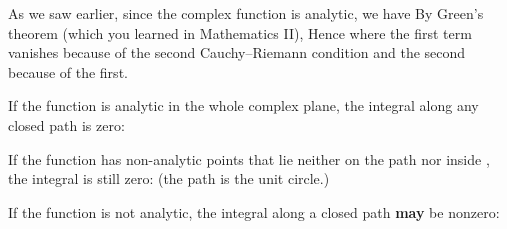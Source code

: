 
\begin{EMproof}

As we saw earlier, since the complex function is analytic, we have
By Green's theorem (which you learned in Mathematics II),
Hence
where the first term vanishes because of the second Cauchy--Riemann condition and the second because of the first.

\end{EMproof}

\begin{EMexample}{}

If the function is analytic in the whole complex plane, the integral along any closed path is zero:

\end{EMexample}

\begin{EMexample}{}

If the function has non-analytic points that lie neither on the path nor inside , the integral is still zero:
(the path is the unit circle.)

\end{EMexample}

\begin{EMexample}{}

If the function is not analytic, the integral along a closed path \textbf{may} be nonzero:

\end{EMexample}

